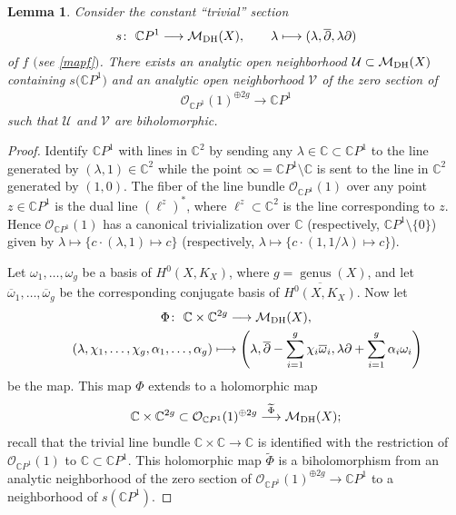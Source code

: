 \documentclass[pdftex]{sigma}
\numberwithin{equation}{section}
\newtheorem{Lemma}[Theorem]{Lemma}
\begin{document}
\begin{Lemma}\label{lem-m} Consider the constant ``trivial'' section
\begin{gather*}
s \colon \ {\mathbb C}P^1 \longrightarrow {\mathcal M}_{\rm DH}(X) ,\qquad \lambda \longmapsto (\lambda, \overline{\partial}, \lambda\partial)
\end{gather*}
of $f$ $($see \eqref{mapf}$)$. There exists an analytic open neighborhood ${\mathcal U} \subset {\mathcal M}_{\rm DH}(X)$ containing $s\big({\mathbb C}P^1\big)$ and an analytic open neighborhood $\mathcal V$ of the zero section of
\begin{gather*}{\mathcal O}_{{\mathbb C}P^1}(1)^{\oplus 2g} \longrightarrow {\mathbb C}P^1\end{gather*}
such that $\mathcal U$ and $\mathcal V$ are biholomorphic.
\end{Lemma}

\begin{proof} Identify ${\mathbb C}P^1$ with lines in ${\mathbb C}^2$ by sending any $\lambda \in {\mathbb C} \subset {\mathbb C}P^1$ to the line generated by $(\lambda, 1) \in {\mathbb C}^2$ while the point $\infty = {\mathbb C}P^1 \setminus {\mathbb C}$ is sent to the line in ${\mathbb C}^2$ generated by $(1, 0)$. The f\/iber of the line bundle ${\mathcal O}_{{\mathbb C}P^1}(1)$ over any point $z \in {\mathbb C}P^1$ is the dual line $(\ell^z)^*$, where $\ell^z \subset {\mathbb C}^2$ is the line corresponding to $z$. Hence ${\mathcal O}_{{\mathbb C}P^1}(1)$ has a canonical trivialization over $\mathbb C$ (respectively, $\mathbb CP^1\setminus\{0\}$) given by $\lambda \longmapsto \{c\cdot (\lambda, 1) \longmapsto c\}$ (respectively, $\lambda \longmapsto \{c\cdot (1, 1/\lambda)  \longmapsto c\}$).

Let $\omega_1, \dots ,\omega_g$ be a basis of $H^0(X, K_X)$, where $g = \operatorname{genus}(X)$, and let $\overline{\omega}_1, \dots , \overline{\omega}_g$ be the corresponding conjugate basis of $\overline{H^0(X, K_X)}$. Now let
\begin{gather*}
\Phi \colon \ {\mathbb C}\times {\mathbb C}^{2g} \longrightarrow {\mathcal M}_{\rm DH}(X),\\
\hphantom{\Phi \colon}{} \ (\lambda, \chi_1, \dots ,\chi_g, \alpha_1, \dots , \alpha_g) \longmapsto
\left(\lambda, \overline{\partial}-\sum_{i=1}^g\chi_i\overline{\omega}_i, \lambda \partial+\sum_{i=1}^g\alpha_i\omega_i\right)
\end{gather*}
be the map. This map $\Phi$ extends to a holomorphic map
\begin{gather*}
{\mathbb C}\times {\mathbb C}^{2g} \subset {\mathcal O}_{{\mathbb C}P^1}(1)^{\oplus 2g} \stackrel{\widetilde\Phi}{\longrightarrow}
{\mathcal M}_{\rm DH}(X) ;
\end{gather*}
recall that the trivial line bundle ${\mathbb C}\times {\mathbb C} \longrightarrow {\mathbb C}$ is identif\/ied with the restriction of ${\mathcal O}_{{\mathbb C}P^1}(1)$ to ${\mathbb C} \subset {\mathbb C}P^1$. This holomorphic map $\widetilde\Phi$ is a biholomorphism from an analytic neighborhood of the zero section of ${\mathcal O}_{{\mathbb C}P^1}(1)^{\oplus 2g} \longrightarrow {\mathbb C}P^1$ to a neighborhood of $s({\mathbb C}P^1)$.
\end{proof}
\end{document}
